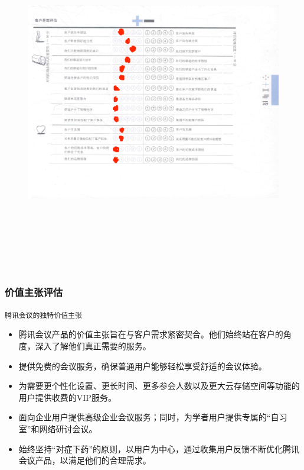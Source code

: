 \documentclass[a4paper,12pt]{article}
\begin{document}
    \begin{figure}[htbp]
        \centering
        \includegraphics[width=20cm,height=15cm]{png/S&W3}
    \end{figure}
    \clearpage %
    \subsubsection{价值主张评估}
    \texttt{腾讯会议的独特价值主张}

\begin{itemize}
  \item 腾讯会议产品的价值主张旨在与客户需求紧密契合。他们始终站在客户的角度，深入了解他们真正需要的服务。
  
  \item 提供免费的会议服务，确保普通用户能够轻松享受舒适的会议体验。
  
  \item 为需要更个性化设置、更长时间、更多参会人数以及更大云存储空间等功能的用户提供收费的VIP服务。
  
  \item 面向企业用户提供高级企业会议服务；同时，为学者用户提供专属的“自习室”和网络研讨会议。
  
  \item 始终坚持“对症下药”的原则，以用户为中心，通过收集用户反馈不断优化腾讯会议产品，以满足他们的合理需求。
\end{itemize}
\end{document}
